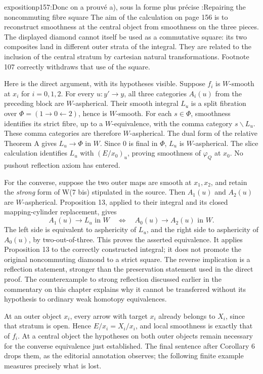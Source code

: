 \begin{dcomment}{exposition}{p157:Donc on a prouvé a), sous la forme plus précise :}{Repairing the noncommuting fibre square}
The aim of the calculation on page 156 is to reconstruct smoothness at the central object from smoothness on the three pieces. The displayed diamond cannot itself be used as a commutative square: its two composites land in different outer strata of the integral. They are related to the inclusion of the central stratum by cartesian natural transformations. Footnote 107 correctly withdraws that use of the square.

Here is the direct argument, with its hypotheses visible. Suppose $f_i$ is $W$-smooth at $x_i$ for $i=0,1,2$. For every $u:y'\to y$, all three categories $A_i(u)$ from the preceding block are $W$-aspherical. Their smooth integral $L_u$ is a split fibration over $\Phi=(1\to0\leftarrow2)$, hence is $W$-smooth. For each $s\in\Phi$, smoothness identifies its strict fibre, up to a $W$-equivalence, with the comma category $s\backslash L_u$. These comma categories are therefore $W$-aspherical. The dual form of the relative Theorem A gives $L_u\to\Phi$ in $W$. Since $0$ is final in $\Phi$, $L_u$ is $W$-aspherical. The slice calculation identifies $L_u$ with $(E/x_0)_u$, proving smoothness of $\varphi_Q$ at $x_0$. No pushout reflection axiom has entered.

For the converse, suppose the two outer maps are smooth at $x_1,x_2$, and retain the \emph{strong} form of W(7 bis) stipulated in the source. Then $A_1(u)$ and $A_2(u)$ are $W$-aspherical. Proposition 13, applied to their integral and its closed mapping-cylinder replacement, gives
\[
 A_1(u)\longrightarrow L_u\text{ in }W
 \quad\Longleftrightarrow\quad
 A_0(u)\longrightarrow A_2(u)\text{ in }W.
\]
The left side is equivalent to asphericity of $L_u$, and the right side to asphericity of $A_0(u)$, by two-out-of-three. This proves the asserted equivalence. It applies Proposition 13 to the correctly constructed integral; it does not promote the original noncommuting diamond to a strict square. The reverse implication is a reflection statement, stronger than the preservation statement used in the direct proof. The counterexample to strong reflection discussed earlier in the commentary on this chapter explains why it cannot be transferred without its hypothesis to ordinary weak homotopy equivalences.

At an outer object $x_i$, every arrow with target $x_i$ already belongs to $X_i$, since that stratum is open. Hence $E/x_i=X_i/x_i$, and local smoothness is exactly that of $f_i$. At a central object the hypotheses on both outer objects remain necessary for the converse equivalence just established. The final sentence after Corollary 6 drops them, as the editorial annotation observes; the following finite example measures precisely what is lost.
\end{dcomment}


